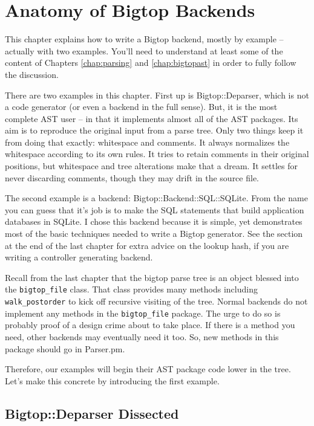 \chapter{Anatomy of Bigtop Backends}
\label{chap:backendanat}

This chapter explains how to write a Bigtop backend, mostly by example --
actually with two examples.  You'll need to understand at least
some of the content of Chapters \ref{chap:parsing} and \ref{chap:bigtopast}
in order to fully follow the discussion.

There are two examples in this chapter.  First up is Bigtop::Deparser, which
is not a code generator (or even a backend in the full sense).  But, it is
the most complete AST user -- in that it implements almost all of the AST
packages.  Its aim is to reproduce the original input from a parse tree.
Only two things keep it from doing that exactly: whitespace and comments.
It always normalizes the whitespace according to its own rules.  It tries
to retain comments in their original positions, but whitespace and tree
alterations make that a dream.  It settles for never discarding comments,
though they may drift in the source file.

The second example is a backend: Bigtop::Backend::SQL::SQLite.  From the
name you can guess that it's job is to make the SQL statements that build
application databases in SQLite.  I chose this backend because it is simple,
yet demonstrates most of the basic techniques needed to write a Bigtop
generator.  See the section at the end of the last chapter for extra
advice on the lookup hash, if you are writing a controller generating backend.

Recall from the last chapter that the bigtop parse tree is an object blessed
into the \verb+bigtop_file+ class.  That class provides many methods
including \verb+walk_postorder+ to kick off recursive visiting of the tree.
Normal backends do not implement any methods in the \verb+bigtop_file+
package.  The urge to do so is probably proof of a design crime about to
take place.  If there is a method you need, other backends may eventually
need it too.  So, new methods in this package should go in Parser.pm.

Therefore, our examples will begin their AST package code lower in the
tree.  Let's make this concrete by introducing the first example.

\section{Bigtop::Deparser Dissected}

